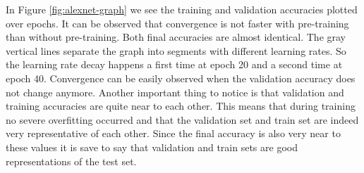 \begin{table}[h] \centering
{}
\caption{Hyper parameters for Alexnet optimized with SigOpt. First line shows the model trained from scratch and the second line shows the pre-trained model.}
\label{tbl:AlexNetBaseline}
\end{table}

\begin{table}[h] \centering
{}
\caption{The Alexnet architecture was run 5 times with the found hyperparameters and averaged across the runs. Aditionally the Adam optimizer is used instead of weight and lr-decay.}
\label{tbl:AlexNetMultiRun}
\end{table}

In Figure \ref{fig:alexnet-graph} we see the training and validation accuracies plotted over epochs. It can be observed that convergence is not faster with pre-training than without pre-training. Both final accuracies are almost identical. The gray vertical lines separate the graph into segments with different learning rates. So the learning rate decay happens a first time at epoch 20 and a second time at epoch 40. Convergence can be easily observed when the validation accuracy does not change anymore. Another important thing to notice is that validation and training accuracies are quite near to each other. This means that during training no severe overfitting occurred and that the validation set and train set are indeed very representative of each other. Since the final accuracy is also very near to these values it is save to say that validation and train sets are good representations of the test set.

